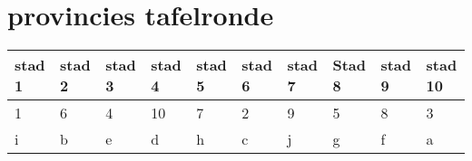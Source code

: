 \section{provincies tafelronde}
\begin{table}[h]
\centering
\begin{tabular}{|l|l|l|l|l|l|l|l|l|l|}
\hline
stad 1 & stad 2 & stad 3 & stad 4 & stad 5 & stad 6 & stad 7 & Stad 8 & stad 9 & stad 10 \\ \hline
1 & 6 & 4 & 10 & 7 & 2 & 9 & 5 & 8 & 3 \\ \hline
i & b & e & d & h & c & j & g & f & a \\ \hline
\end{tabular}
\end{table}